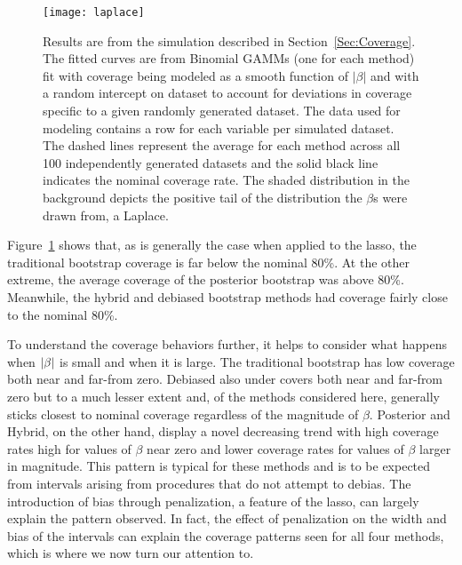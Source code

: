 \begin{figure}[hbtp]
  \begin{center}
  \texttt{[image: laplace]}
  \caption{\label{Fig:laplace} Results are from the simulation described in Section~\ref{Sec:Coverage}. The fitted curves are from Binomial GAMMs (one for each method) fit with coverage being modeled as a smooth function of $|\beta|$ and with a random intercept on dataset to account for deviations in coverage specific to a given randomly generated dataset. The data used for modeling contains a row for each variable per simulated dataset. The dashed lines represent the average for each method across all 100 independently generated datasets and the solid black line indicates the nominal coverage rate. The shaded distribution in the background depicts the positive tail of the distribution the $\beta$s were drawn from, a Laplace.}
  \end{center}
\end{figure}


Figure~\ref{Fig:laplace} shows that, as is generally the case when applied to the lasso, the traditional bootstrap coverage is far below the nominal 80\%. At the other extreme, the average coverage of the posterior bootstrap was above 80\%. Meanwhile, the hybrid and debiased bootstrap methods had coverage fairly close to the nominal 80\%.


To understand the coverage behaviors further, it helps to consider what happens when $\left\lvert\beta\right\rvert$ is small and when it is large. The traditional bootstrap has low coverage both near and far-from zero. Debiased also under covers both near and far-from zero but to a much lesser extent and, of the methods considered here, generally sticks closest to nominal coverage regardless of the magnitude of $\beta$.  Posterior and Hybrid, on the other hand, display a novel decreasing trend with high coverage rates high for values of $\beta$ near zero and lower coverage rates for values of $\beta$ larger in magnitude. This pattern is typical for these methods and is to be expected from intervals arising from procedures that do not attempt to debias. The introduction of bias through penalization, a feature of the lasso, can largely explain the pattern observed. In fact, the effect of penalization on the width and bias of the intervals can explain the coverage patterns seen for all four methods, which is where we now turn our attention to.

